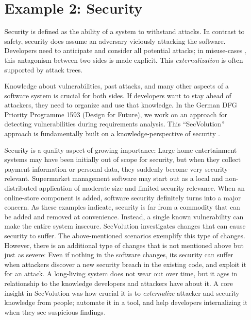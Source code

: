 \section{Example 2: Security}

Security is defined as the ability of a system to withstand attacks. 
In contrast to safety, security does assume an adversary viciously attacking the software. 
Developers need to anticipate and consider all potential attacks; in misuse-cases \cite{Alexander2002a}, this antagonism between two sides is made explicit. This \emph{externalization} is often supported by attack trees.%

Knowledge about vulnerabilities, past attacks, and many other aspects of a software system is crucial for both sides. 
If developers want to stay ahead of attackers, they need to organize and use that knowledge. 
In the German DFG Priority Programme 1593 (Design for Future), we work on an approach for detecting vulnerabilities during requirements analysis. 
This ``SecVolution'' approach is fundamentally built on a knowledge-perspective of security \cite{Gaertner2014,fosad14}. 

Security is a quality aspect of growing importance: Large home entertainment systems may have been initially out of scope for security, but when they collect payment information or personal data, they suddenly become very security-relevant. 
Supermarket management software may start out as a local and non-distributed application of moderate size and limited security relevance. 
When an online-store component is added, software security definitely turns into a major concern. 
As these examples indicate, security is far from a commodity that can be added and removed at convenience. 
Instead, a single known vulnerability can make the entire system insecure. 
SecVolution investigates changes that can cause security to suffer. 
The above-mentioned scenarios exemplify this type of changes. 
However, there is an additional type of changes that is not mentioned above but just as severe: Even if nothing in the software changes, its security can suffer when attackers discover a new security breach in the existing code, and exploit it for an attack. 
A long-living system does not wear out over time, but it ages in relationship to the knowledge developers and attackers have about it. 
A core insight in SecVolution was how crucial it is to \emph{externalize} attacker and security knowledge from people; automate it in a tool, and help developers internalizing it when they see suspicious findings.


